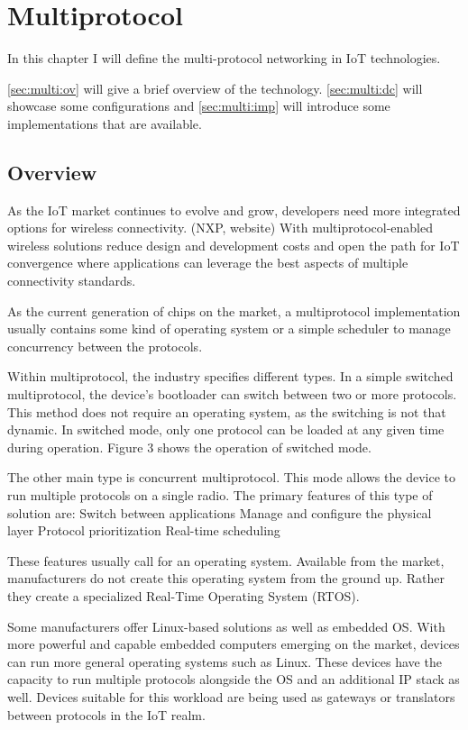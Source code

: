 \section{Multiprotocol}
\label{chap:multiprot}
In this chapter I will define the multi-protocol networking in IoT technologies.

\autoref{sec:multi:ov} will give a brief overview of the technology.
\autoref{sec:multi:dc} will showcase some configurations and \autoref{sec:multi:imp} will introduce some implementations that are available.

\subsection{Overview}
\label{sec:multi:ov}
As the IoT market continues to evolve and grow, developers need more integrated options for wireless connectivity. (NXP, website) With multiprotocol-enabled wireless solutions reduce design and development costs and open the path for IoT convergence where applications can leverage the best aspects of multiple connectivity standards.

As the current generation of chips on the market, a multiprotocol implementation usually contains some kind of operating system or a simple scheduler to manage concurrency between the protocols.

Within multiprotocol, the industry specifies different types. In a simple switched multiprotocol, the device's bootloader can switch between two or more protocols. This method does not require an operating system, as the switching is not that dynamic. In switched mode, only one protocol can be loaded at any given time during operation. Figure 3 shows the operation of switched mode.

The other main type is concurrent multiprotocol. This mode allows the device to run multiple protocols on a single radio. The primary features of this type of solution are:
Switch between applications
Manage and configure the physical layer
Protocol prioritization
Real-time scheduling

These features usually call for an operating system. Available from the market, manufacturers do not create this operating system from the ground up. Rather they create a specialized Real-Time Operating System (RTOS).

Some manufacturers offer Linux-based solutions as well as embedded OS. With more powerful and capable embedded computers emerging on the market, devices can run more general operating systems such as Linux. These devices have the capacity to run multiple protocols alongside the OS and an additional IP stack as well. Devices suitable for this workload are being used as gateways or translators between protocols in the IoT realm.

